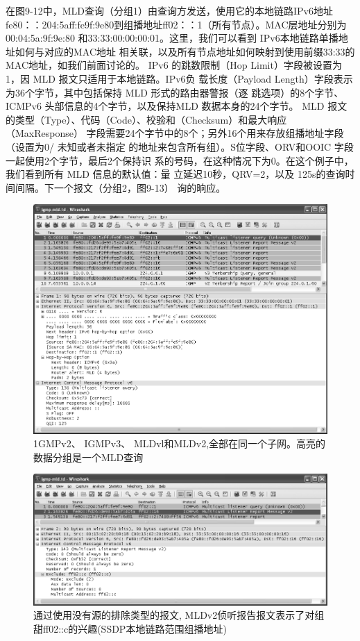 在图9-12中，MLD查询（分组1）由查询方发送，使用它的本地链路IPv6地址
fe80：：204:5aff:fe9f:9e80到组播地址ff02：：1（所有节点）。MAC层地址分别为00:04:5a:9f:9e:80
和33:33:00:00:00:01。这里，我们可以看到 IPv6本地链路单播地址如何与对应的MAC地址
相关联，以及所有节点地址如何映射到使用前缀33:33的MAC地址，如我们前面讨论的。
IPv6 的跳数限制（Hop Limit）字段被设置为1，因 MLD 报文只适用于本地链路。IPv6负
载长度（Payload Length）字段表示为36个字节，其中包括保持 MLD 形式的路由器警报（逐
跳选项）的8个字节、ICMPv6 头部信息的4个字节，以及保持MLD 数据本身的24个字节。
MLD 报文的类型（Type）、代码（Code）、校验和（Checksum）和最大响应（MaxResponse）
字段需要24个字节中的8个；另外16个用来存放组播地址字段（设置为0/ 未知或者未指定
的地址来包含所有组）。S位字段、ORV和OOIC 字段一起使用2个字节，最后2个保持识
系的号码，在这种情况下为0。在这个例子中，我们看到所有 MLD 信息的默认值：量
立延迟10秒，QRV=2，以及 125s的查询时间间隔。下一个报文（分组2，图9-13）
询的晌应。

\begin{figure}[ht]
    \centering
	\includegraphics[width=1.0\textwidth]{imgs/9/9-12.png}
	\caption{1GMPv2、 IGMPv3、 MLDvl和MLDv2,全部在同一个子网。高亮的数据分组是一个MLD查询}
\end{figure}

\begin{figure}[ht]
    \centering
	\includegraphics[width=1.0\textwidth]{imgs/9/9-13.png}
	\caption{通过使用没有源的排除类型的报文, MLDv2侦听报告报文表示了对组甜ff02::c的兴趣(SSDP本地链路范围组播地址)}
\end{figure}

